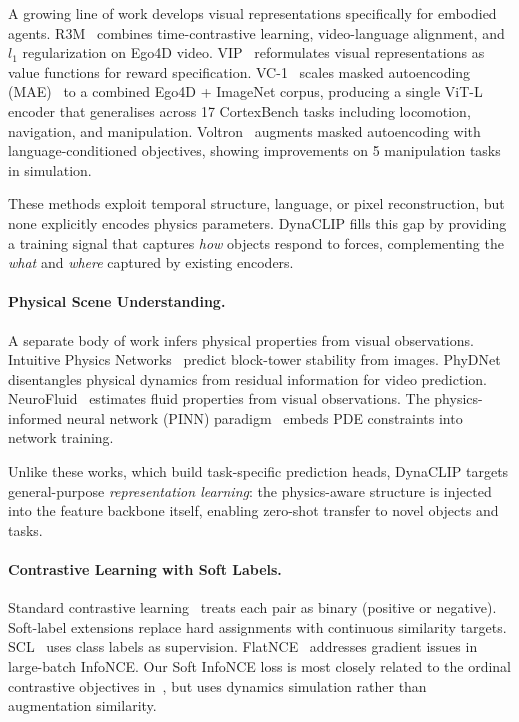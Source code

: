 \documentclass{article}
\newcommand{\methodname}{DynaCLIP}
\begin{document}
A growing line of work develops visual representations specifically for embodied agents. R3M~\cite{nair2022r3m} combines time-contrastive learning, video-language alignment, and $l_1$ regularization on Ego4D video. VIP~\cite{ma2022vip} reformulates visual representations as value functions for reward specification. VC-1~\cite{radosavovic2023vc1} scales masked autoencoding (MAE)~\cite{he2022mae} to a combined Ego4D + ImageNet corpus, producing a single ViT-L encoder that generalises across 17 CortexBench tasks including locomotion, navigation, and manipulation. Voltron~\cite{karamcheti2023voltron} augments masked autoencoding with language-conditioned objectives, showing improvements on 5 manipulation tasks in simulation.

These methods exploit temporal structure, language, or pixel reconstruction, but none explicitly encodes physics parameters. \methodname{} fills this gap by providing a training signal that captures \emph{how} objects respond to forces, complementing the \emph{what} and \emph{where} captured by existing encoders.

\paragraph{Physical Scene Understanding.}
A separate body of work infers physical properties from visual observations. Intuitive Physics Networks~\cite{lerer2016learning} predict block-tower stability from images. PhyDNet~\cite{guen2020disentangling} disentangles physical dynamics from residual information for video prediction. NeuroFluid~\cite{guan2022neurofluid} estimates fluid properties from visual observations. The physics-informed neural network (PINN) paradigm~\cite{raissi2019pinn} embeds PDE constraints into network training.

Unlike these works, which build task-specific prediction heads, \methodname{} targets general-purpose \emph{representation learning}: the physics-aware structure is injected into the feature backbone itself, enabling zero-shot transfer to novel objects and tasks.

\paragraph{Contrastive Learning with Soft Labels.}
Standard contrastive learning~\cite{chen2020simclr,he2020moco} treats each pair as binary (positive or negative). Soft-label extensions replace hard assignments with continuous similarity targets. SCL~\cite{khosla2020supervised} uses class labels as supervision. FlatNCE~\cite{chen2023flatnce} addresses gradient issues in large-batch InfoNCE. Our Soft InfoNCE loss is most closely related to the ordinal contrastive objectives in~\cite{zheng2021ressl}, but uses dynamics simulation rather than augmentation similarity.
\end{document}
